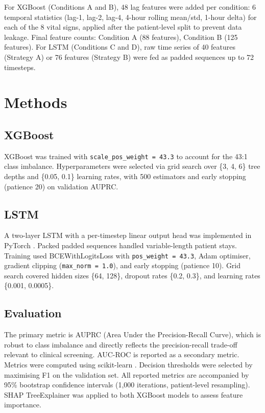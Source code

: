 \documentclass[conference]{IEEEtran}
\begin{document}
For XGBoost (Conditions A and B), 48 lag features were added per condition:
6 temporal statistics (lag-1, lag-2, lag-4, 4-hour rolling mean/std, 1-hour delta)
for each of the 8 vital signs, applied after the patient-level split to prevent
data leakage. Final feature counts: Condition A (88 features), Condition B (125
features). For LSTM (Conditions C and D), raw time series of 40 features (Strategy A)
or 76 features (Strategy B) were fed as padded sequences up to 72 timesteps.

\section{Methods}

\subsection{XGBoost}

XGBoost \cite{chen2016xgboost} was trained with \texttt{scale\_pos\_weight\,=\,43.3}
to account for the 43:1 class imbalance. Hyperparameters were selected via grid
search over \{3, 4, 6\} tree depths and \{0.05, 0.1\} learning rates, with 500
estimators and early stopping (patience 20) on validation AUPRC.

\subsection{LSTM}

A two-layer LSTM \cite{hochreiter1997long} with a per-timestep linear output head
was implemented in PyTorch \cite{paszke2019pytorch}. Packed padded sequences
handled variable-length patient stays. Training used BCEWithLogitsLoss with
\texttt{pos\_weight\,=\,43.3}, Adam optimiser, gradient clipping
(\texttt{max\_norm\,=\,1.0}), and early stopping (patience 10). Grid search covered
hidden sizes \{64, 128\}, dropout rates \{0.2, 0.3\}, and learning rates
\{0.001, 0.0005\}.

\subsection{Evaluation}

The primary metric is AUPRC (Area Under the Precision-Recall Curve), which is robust
to class imbalance and directly reflects the precision-recall trade-off relevant to
clinical screening. AUC-ROC is reported as a secondary metric. Metrics were computed
using scikit-learn \cite{pedregosa2011scikit}. Decision thresholds were selected by
maximising F1 on the validation set. All reported metrics are accompanied by 95\%
bootstrap confidence intervals (1,000 iterations, patient-level resampling). SHAP
TreeExplainer \cite{lundberg2017unified} was applied to both XGBoost models to assess
feature importance.
\end{document}
